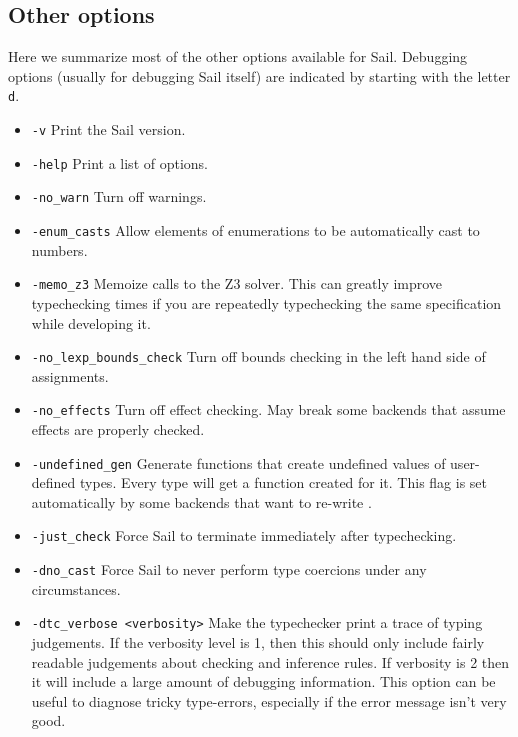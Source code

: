 \subsection{Other options}

Here we summarize most of the other options available for
Sail. Debugging options (usually for debugging Sail itself) are
indicated by starting with the letter \verb+d+.

\begin{itemize}
\item {\verb+-v+} Print the Sail version.

\item {\verb+-help+} Print a list of options.

\item {\verb+-no_warn+} Turn off warnings.

\item {\verb+-enum_casts+} Allow elements of enumerations to be
  automatically cast to numbers.

\item \verb+-memo_z3+ Memoize calls to the Z3 solver. This can greatly
  improve typechecking times if you are repeatedly typechecking the
  same specification while developing it.

\item \verb+-no_lexp_bounds_check+ Turn off bounds checking in the left
  hand side of assignments.

\item \verb+-no_effects+ Turn off effect checking. May break some
  backends that assume effects are properly checked.

\item \verb+-undefined_gen+ Generate functions that create undefined
  values of user-defined types. Every type  will get a
   function created for it. This flag is set
  automatically by some backends that want to re-write .

\item \verb+-just_check+ Force Sail to terminate immediately after
  typechecking.

\item \verb+-dno_cast+ Force Sail to never perform type coercions
  under any circumstances.

\item \verb+-dtc_verbose <verbosity>+ Make the typechecker print a
  trace of typing judgements. If the verbosity level is 1, then this
  should only include fairly readable judgements about checking and
  inference rules. If verbosity is 2 then it will include a large
  amount of debugging information. This option can be useful to
  diagnose tricky type-errors, especially if the error message isn't
  very good.


\end{itemize}
